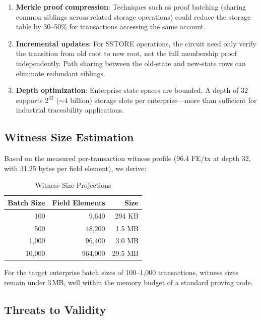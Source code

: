 \documentclass[conference]{IEEEtran}
\begin{document}
\begin{enumerate}
\item \textbf{Merkle proof compression}: Techniques such as
      proof batching (sharing common siblings across related storage
      operations) could reduce the storage table by 30--50\% for
      transactions accessing the same account.
\item \textbf{Incremental updates}: For SSTORE operations, the circuit
      need only verify the transition from old root to new root, not
      the full membership proof independently. Path sharing between
      the old-state and new-state rows can eliminate redundant siblings.
\item \textbf{Depth optimization}: Enterprise state spaces are
      bounded. A depth of 32 supports $2^{32}$ ($\sim$4 billion)
      storage slots per enterprise---more than sufficient for
      industrial traceability applications.
\end{enumerate}

\subsection{Witness Size Estimation}

Based on the measured per-transaction witness profile (96.4 FE/tx
at depth 32, with 31.25 bytes per field element), we derive:

\begin{table}[htbp]
\caption{Witness Size Projections}
\label{tab:projections}
\centering
\begin{tabular}{rrr}
\toprule
\textbf{Batch Size} & \textbf{Field Elements} & \textbf{Size} \\
\midrule
100       & 9{,}640     & 294 KB  \\
500       & 48{,}200    & 1.5 MB  \\
1{,}000   & 96{,}400    & 3.0 MB  \\
10{,}000  & 964{,}000   & 29.5 MB \\
\bottomrule
\end{tabular}
\end{table}

For the target enterprise batch sizes of 100--1{,}000 transactions,
witness sizes remain under 3\,MB, well within the memory budget of a
standard proving node.

\subsection{Threats to Validity}
\end{document}
